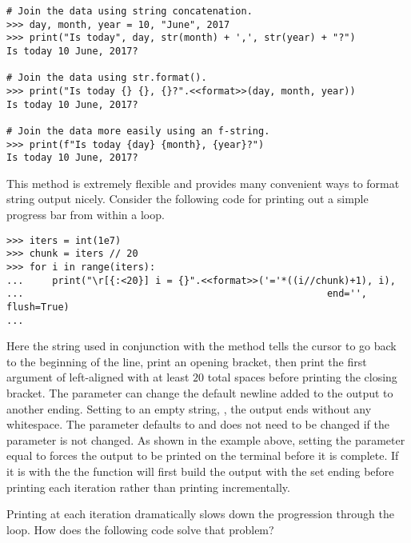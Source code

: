 \begin{lstlisting}
# Join the data using string concatenation.
>>> day, month, year = 10, "June", 2017
>>> print("Is today", day, str(month) + ',', str(year) + "?")
Is today 10 June, 2017?

# Join the data using str.format().
>>> print("Is today {} {}, {}?".<<format>>(day, month, year))
Is today 10 June, 2017?

# Join the data more easily using an f-string.
>>> print(f"Is today {day} {month}, {year}?")
Is today 10 June, 2017?
\end{lstlisting}

This method is extremely flexible and provides many convenient ways to format string output nicely.
Consider the following code for printing out a simple progress bar from within a loop.

\begin{lstlisting}
>>> iters = int(1e7)
>>> chunk = iters // 20
>>> for i in range(iters):
...     print("\r[{:<20}] i = {}".<<format>>('='*((i//chunk)+1), i),
...                                                     end='', flush=True)
...
\end{lstlisting}

Here the string  used in conjunction with the  method tells the cursor to go back to the beginning of the line, print an opening bracket, then print the first argument of  left-aligned with at least $20$ total spaces before printing the closing bracket. The   parameter can change the default newline added to the output to another ending. Setting to an empty string, , the output ends without any whitespace. The  parameter defaults to   and does not need to be changed if the   parameter is not changed. As shown in the example above, setting the parameter equal to  forces the output to be printed on the terminal before it is complete. If it is  with the   the  function will first build the output with the set ending before printing each iteration rather than printing incrementally. 

Printing at each iteration dramatically slows down the progression through the loop.
How does the following code solve that problem?

